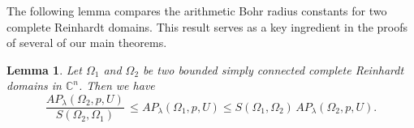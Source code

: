 \documentclass[a4paper,11pt, reqno]{amsart}
\newtheorem{lem}{Lemma}[section]
\theoremstyle{definition}
\begin{document}
The following lemma compares the arithmetic Bohr radius constants for two complete Reinhardt domains. This result serves as a key ingredient in the proofs of several of our main theorems.
\begin{lem} \label{lem-3.6}
	Let $\Omega_{1}$ and $\Omega_{2}$ be two bounded simply connected complete Reinhardt domains in $\mathbb{C}^n$. Then we have $$\frac{AP_{\lambda}(\Omega_{2}, p,U)}{S(\Omega_{2},\Omega_{1})} \, \leq AP_{\lambda}(\Omega_{1}, p,U) \leq S(\Omega_{1},\Omega_{2}) \, AP_{\lambda}(\Omega_{2}, p,U).
	$$
\end{lem}
\end{document}
